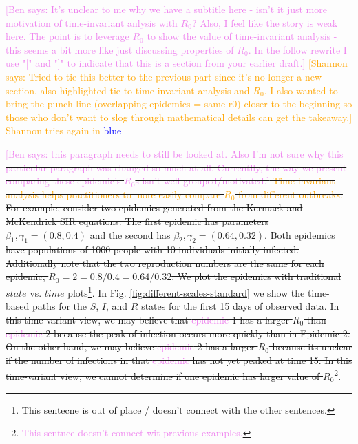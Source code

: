 \documentclass[
  shortnames]{jss}
\begin{document}
\textcolor{violet}{[Ben says: It's unclear to me why we have a subtitle here - isn't it just more motivation of time-invariant anlysis with $R_0$? Also, I feel like the story is weak here. The point is to leverage $R_0$ to show the value of time-invariant analysis - this seems a bit more like just discussing properties of $R_0$. In the follow rewrite I use "[" and "]" to indicate that this is a section from your earlier draft.]}
\textcolor{orange}{[Shannon says: Tried to tie this better to the previous part since it's no longer a new section.  also highlighted tie to time-invariant analysis and $R_0$.  I also wanted to bring the punch line (overlapping epidemics = same r0) closer to the beginning so those who don't want to slog through mathematical details can get the takeaway.]}\textcolor{orange}{ Shannon tries again in \textcolor{blue}{blue}}

\sout{\textcolor{violet}{[Ben says: this paragraph needs to still be looked at. Also I'm not sure why this particular paragraph was changed so much at all. Currentlly, the way we present comparing these epidemic's $R_0$s isn't well grouped/motivated.]} \textcolor{orange}{Time-invariant analysis helps practitioners to more easily compare $R_0$ from different outbreaks.} For example, consider two epidemics generated from the Kermack and McKendrick SIR equations. The first epidemic has parameters $\beta_1, \gamma_1 = (0.8,0.4)$ and the second has $\beta_2, \gamma_2 = (0.64,0.32)$.  Both epidemics have populations of 1000 people with 10 individuals initially infected.  Additionally note that the two reproduction numbers are the same for each epidemic, $R_0 = 2=0.8/0.4 = 0.64/0.32$.  We plot the epidemics with traditional $state$ vs. $time$ plots}\footnote{This sentecne is out of place / doesn't connect with the other sentences.}.
\sout{In Fig. \ref{fig:different-scales-standard} we show the time-based paths for the $S$, $I$, and $R$ states for the first 15 days of observed data.  In this time-variant view, we may believe that \textcolor{violet}{epidemic} 1 has a larger $R_0$ than \textcolor{violet}{epidemic} 2 because the peak of infection occurs more quickly than in Epidemic 2.  On the other hand, we may believe \textcolor{violet}{epidemic} 2 has a larger $R_0$ because its unclear if the  number of infections in that \textcolor{violet}{epidemic} has not yet peaked at time 15.  In this time-variant view, we cannot determine if one epidemic has larger value of $R_0$}\footnote{\textcolor{violet}{This sentnce doesn't connect wit previous examples.}}.
\end{document}
